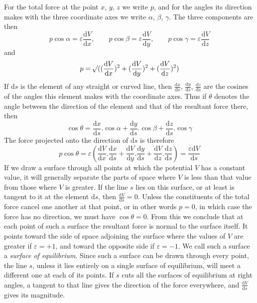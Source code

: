 For the total force at the point $x$, $y$, $z$ we write $p$, and for the angles its direction makes with the three coordinate axes we write $\alpha$, $\beta$, $\gamma$. The three components are then
\[
p\cos\alpha=\varepsilon\frac{\mathrm{d}V}{\mathrm{d}x},\qquad p\cos\beta=\varepsilon\frac{\mathrm{d}V}{\mathrm{d}y},\qquad p\cos\gamma=\varepsilon\frac{\mathrm{d}V}{\mathrm{d}z}
\]
and
\[
p=\mathord{{}^{}\!\surd}((\frac{\mathrm{d}V}{\mathrm{d}x})^2+(\frac{\mathrm{d}V}{\mathrm{d}y})^2+(\frac{\mathrm{d}V}{\mathrm{d}z})^2)
\]
If $\mathrm{d}s$ is the element of any straight or curved line, then $\frac{\mathrm{d}x}{\mathrm{d}s}$, $\frac{\mathrm{d}y}{\mathrm{d}s}$, $\frac{\mathrm{d}z}{\mathrm{d}s}$ are the cosines of the angles this element makes with the coordinate axes. Thus if $\theta$ denotes the angle between the direction of the element and that of the resultant force there, then
\[
\cos\theta=\frac{\mathrm{d}x}{\mathrm{d}s}.\cos\alpha+\frac{\mathrm{d}y}{\mathrm{d}s}.\cos\beta+\frac{\mathrm{d}z}{\mathrm{d}s}.\cos\gamma
\]
The force projected onto the direction of $\mathrm{d}s$ is therefore
\[
p\cos\theta=\varepsilon(\frac{\mathrm{d}V}{\mathrm{d}x}.\frac{\mathrm{d}x}{\mathrm{d}s}+\frac{\mathrm{d}V}{\mathrm{d}y}.\frac{\mathrm{d}y}{\mathrm{d}s}+\frac{\mathrm{d}V}{\mathrm{d}z}.\frac{\mathrm{d}z}{\mathrm{d}s})=\frac{\varepsilon\mathrm{d}V}{\mathrm{d}s}
\]
If we draw a surface through all points at which the potential $V$ has a constant value, it will generally separate the parts of
space where $V$ is less than that value from those where $V$ is greater. If the line $s$ lies on this surface, or at least is tangent to it at the element $\mathrm{d}s$, then $\frac{\mathrm{d}V}{\mathrm{d}s}=0$. Unless the constituents of the total force cancel one another at that point, or in other words $p=0$, in which case the force has no direction, we must have $\cos\theta=0$. From this we conclude that at each point of such a surface the resultant force is normal to the surface itself. It points toward the side of space adjoining the surface where the values of $V$ are greater if $\varepsilon=+1$, and toward the opposite side if $\varepsilon=-1$. We call such a surface a \textit{surface of equilibrium}. Since such a surface can be drawn through every point, the line $s$, unless it lies entirely on a single surface of equilibrium, will meet a different one at each of its points. If $s$ cuts all the surfaces of equilibrium at right angles, a tangent to that line gives the direction of the force everywhere, and $\frac{\mathrm{d}V}{\mathrm{d}s}$ gives its magnitude.

